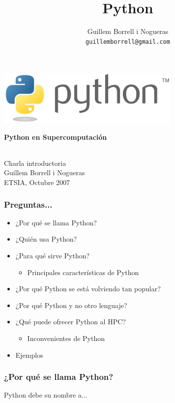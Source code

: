 \documentclass{beamer}
\title{Python}
\author{
Guillem Borrell i Nogueras\\
\texttt{guillemborrell@gmail.com}
}
\begin{document}
\begin{frame}
\begin{center}
 \includegraphics[width=9cm]{files/python-logo-generic.pdf}\\
\begin{large}
\textbf{Python en Supercomputación}
\end{large}\\
Charla introductoria\\

Guillem Borrell i Nogueras\\

ETSIA, Octubre 2007
\end{center}

\end{frame}


\begin{frame}
 \frametitle{Preguntas...}
 \begin{itemize}
 \item ¿Por qué se llama Python?
 \item ¿Quién usa Python?
 \item ¿Para qué sirve Python?
 \begin{itemize}
  \item Principales características de Python
 \end{itemize}
 \item ¿Por qué Python se está volviendo tan popular?
 \item ¿Por qué Python y no otro lenguaje?
 \item ¿Qué puede ofrecer Python al HPC?
 \begin{itemize}
   \item Inconvenientes de Python
 \end{itemize}
  \item Ejemplos
 \end{itemize}

\end{frame}

\begin{frame}
 \frametitle{¿Por qué se llama Python?}
 Python debe su nombre a...
\end{frame}
\end{document}
